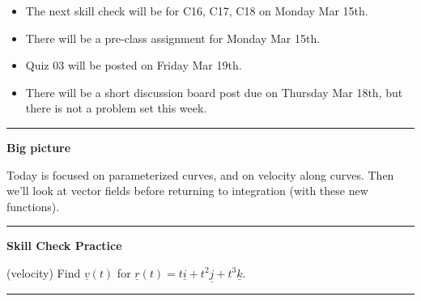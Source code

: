 \documentclass[12pt,letterpaper,noanswers]{exam}
\newcommand{\mb}[1]{\underline{#1}}
\begin{document}
 \pdfpageheight 11in 
  \pdfpagewidth 8.5in





\begin{itemize}
\itemsep0em
    \item The next skill check will be for C16, C17, C18 on Monday Mar 15th.
    \item There will be a pre-class assignment for Monday Mar 15th.
    \item Quiz 03 will be posted on Friday Mar 19th.
    \item There will be a short discussion board post due on Thursday Mar 18th, but there is not a problem set this week.
\end{itemize}

\hrule
\vspace{0.2cm}


\noindent\textbf{Big picture}

Today is focused on parameterized curves, and on velocity along curves.  Then we'll look at vector fields before returning to integration (with these new functions).

\vspace{0.2cm}
\hrule
\vspace{0.2cm}



\noindent\textbf{Skill Check Practice}
\begin{questions}
\question (velocity) Find $\mb v(t)$ for $\mb{r}(t) = t\mb i + t^2\mb j + t^3\mb k$.
\end{questions}


\vspace{0.2cm}
\hrule
\vspace{0.2cm}
\end{document}

